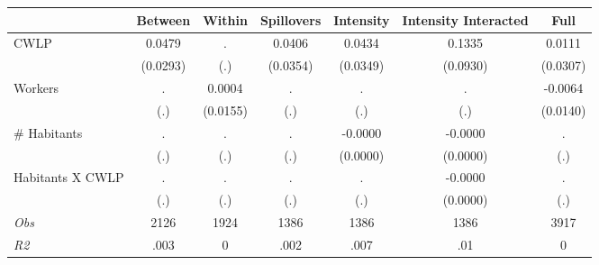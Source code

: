 \begin{tabular}{l*{6}{c}}\hline&\multicolumn{1}{c}{Between}&\multicolumn{1}{c}{Within}&\multicolumn{1}{c}{Spillovers}&\multicolumn{1}{c}{Intensity}&\multicolumn{1}{c}{Intensity Interacted}&\multicolumn{1}{c}{Full}\\ \hline 
CWLP & 0.0479 & . & 0.0406 & 0.0434 & 0.1335 & 0.0111 \\
 & (0.0293) & (.) & (0.0354) & (0.0349) & (0.0930) & (0.0307) \\
Workers & . & 0.0004 & . & . & . & -0.0064 \\
 & (.) & (0.0155) & (.) & (.) & (.) & (0.0140) \\
\# Habitants & . & . & . & -0.0000 & -0.0000 & . \\
 & (.) & (.) & (.) & (0.0000) & (0.0000) & (.) \\
Habitants X CWLP & . & . & . & . & -0.0000 & . \\
 & (.) & (.) & (.) & (.) & (0.0000) & (.) \\
\hline \textit{Obs} & 2126 & 1924 & 1386 & 1386 & 1386 & 3917 \\ \textit{R2} & .003 & 0 & .002 & .007 & .01 & 0 \\ \hline \end{tabular}
